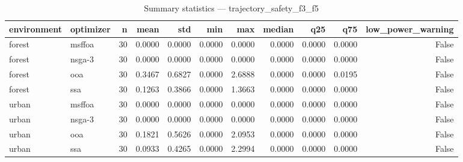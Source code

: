 \begin{table}
\caption{Summary statistics — trajectory_safety_f3_f5}
\label{tab:summary-trajectory_safety_f3_f5}
\begin{tabular}{llrrrrrrrrr}
\toprule
environment & optimizer & n & mean & std & min & max & median & q25 & q75 & low\_power\_warning \\
\midrule
forest & msffoa & 30 & 0.0000 & 0.0000 & 0.0000 & 0.0000 & 0.0000 & 0.0000 & 0.0000 & False \\
forest & nsga-3 & 30 & 0.0000 & 0.0000 & 0.0000 & 0.0000 & 0.0000 & 0.0000 & 0.0000 & False \\
forest & ooa & 30 & 0.3467 & 0.6827 & 0.0000 & 2.6888 & 0.0000 & 0.0000 & 0.0195 & False \\
forest & ssa & 30 & 0.1263 & 0.3866 & 0.0000 & 1.3663 & 0.0000 & 0.0000 & 0.0000 & False \\
urban & msffoa & 30 & 0.0000 & 0.0000 & 0.0000 & 0.0000 & 0.0000 & 0.0000 & 0.0000 & False \\
urban & nsga-3 & 30 & 0.0000 & 0.0000 & 0.0000 & 0.0000 & 0.0000 & 0.0000 & 0.0000 & False \\
urban & ooa & 30 & 0.1821 & 0.5626 & 0.0000 & 2.0953 & 0.0000 & 0.0000 & 0.0000 & False \\
urban & ssa & 30 & 0.0933 & 0.4265 & 0.0000 & 2.2994 & 0.0000 & 0.0000 & 0.0000 & False \\
\bottomrule
\end{tabular}
\end{table}
